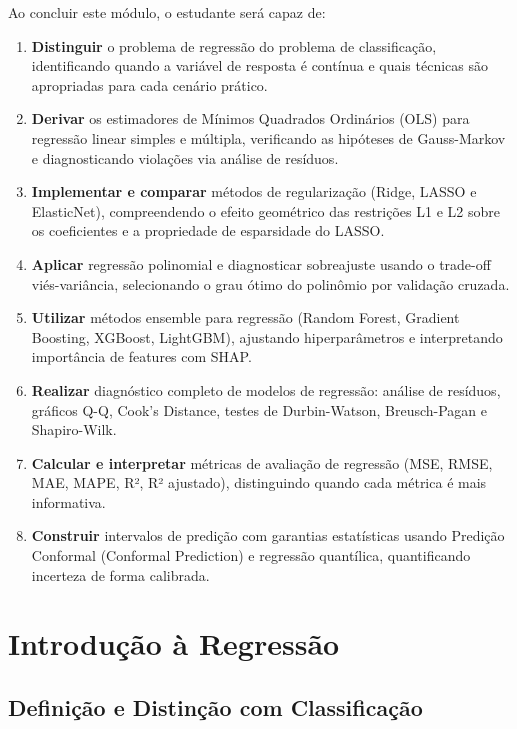 \documentclass[12pt,a4paper]{article}
\begin{document}
Ao concluir este módulo, o estudante será capaz de:

\begin{enumerate}[leftmargin=2em,label=\textcolor{mineblue}{\faIcon{check-circle}}]
  \item \textbf{Distinguir} o problema de regressão do problema de classificação, identificando quando a variável de resposta é contínua e quais técnicas são apropriadas para cada cenário prático.
  \item \textbf{Derivar} os estimadores de Mínimos Quadrados Ordinários (OLS) para regressão linear simples e múltipla, verificando as hipóteses de Gauss-Markov e diagnosticando violações via análise de resíduos.
  \item \textbf{Implementar e comparar} métodos de regularização (Ridge, LASSO e ElasticNet), compreendendo o efeito geométrico das restrições L1 e L2 sobre os coeficientes e a propriedade de esparsidade do LASSO.
  \item \textbf{Aplicar} regressão polinomial e diagnosticar sobreajuste usando o trade-off viés-variância, selecionando o grau ótimo do polinômio por validação cruzada.
  \item \textbf{Utilizar} métodos ensemble para regressão (Random Forest, Gradient Boosting, XGBoost, LightGBM), ajustando hiperparâmetros e interpretando importância de features com SHAP.
  \item \textbf{Realizar} diagnóstico completo de modelos de regressão: análise de resíduos, gráficos Q-Q, Cook's Distance, testes de Durbin-Watson, Breusch-Pagan e Shapiro-Wilk.
  \item \textbf{Calcular e interpretar} métricas de avaliação de regressão (MSE, RMSE, MAE, MAPE, R², R² ajustado), distinguindo quando cada métrica é mais informativa.
  \item \textbf{Construir} intervalos de predição com garantias estatísticas usando Predição Conformal (Conformal Prediction) e regressão quantílica, quantificando incerteza de forma calibrada.
\end{enumerate}

\section{Introdução à Regressão}

\subsection{Definição e Distinção com Classificação}
\end{document}

